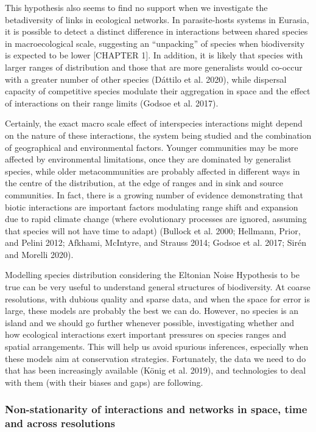 \documentclass[11pt]{article}
\begin{document}
This hypothesis also seems to find no support when we investigate the
betadiversity of links in ecological networks. In parasite-hosts systems
in Eurasia, it is possible to detect a distinct difference in
interactions between shared species in macroecological scale, suggesting
an ``unpacking'' of species when biodiversity is expected to be lower
{[}CHAPTER 1{]}. In addition, it is likely that species with larger
ranges of distribution and those that are more generalists would
co-occur with a greater number of other species (Dáttilo et al. 2020),
while dispersal capacity of competitive species modulate their
aggregation in space and the effect of interactions on their range
limits (Godsoe et al. 2017).

Certainly, the exact macro scale effect of interspecies interactions
might depend on the nature of these interactions, the system being
studied and the combination of geographical and environmental factors.
Younger communities may be more affected by environmental limitations,
once they are dominated by generalist species, while older
metacommunities are probably affected in different ways in the centre of
the distribution, at the edge of ranges and in sink and source
communities. In fact, there is a growing number of evidence
demonstrating that biotic interactions are important factors modulating
range shift and expansion due to rapid climate change (where
evolutionary processes are ignored, assuming that species will not have
time to adapt) (Bullock et al. 2000; Hellmann, Prior, and Pelini 2012;
Afkhami, McIntyre, and Strauss 2014; Godsoe et al. 2017; Sirén and
Morelli 2020).

Modelling species distribution considering the Eltonian Noise Hypothesis
to be true can be very useful to understand general structures of
biodiversity. At coarse resolutions, with dubious quality and sparse
data, and when the space for error is large, these models are probably
the best we can do. However, no species is an island and we should go
further whenever possible, investigating whether and how ecological
interactions exert important pressures on species ranges and spatial
arrangements. This will help us avoid spurious inferences, especially
when these models aim at conservation strategies. Fortunately, the data
we need to do that has been increasingly available (König et al. 2019),
and technologies to deal with them (with their biases and gaps) are
following.

\hypertarget{non-stationarity-of-interactions-and-networks-in-space-time-and-across-resolutions}{%
\subsubsection{Non-stationarity of interactions and networks in space,
time and across
resolutions}\label{non-stationarity-of-interactions-and-networks-in-space-time-and-across-resolutions}}
\end{document}

